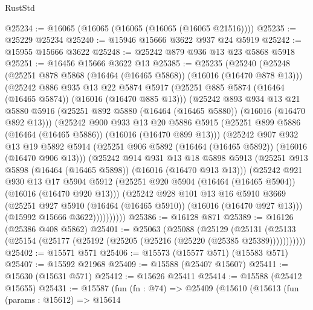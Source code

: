 \begin{lexlean}{RustStd}
\begin{coremodule}
@25234 := @16065 (@16065 (@16065 (@16065 (@16065 @21516))))
@25235 := @25229 @25234
@25240 := @15946 @15666 @3622 @937 @24 @5919
@25242 := @15955 @15666 @3622
@25248 := @25242 @879 @936 @13 @23 @5868 @5918
@25251 := @16456 @15666 @3622 @13
@25385 := @25235
    (@25240
      (@25248
        (@25251 @878 @5868 (@16464 (@16465 @5868)) (@16016 (@16470 @878 @13)))
        (@25242
          @886
          @935
          @13
          @22
          @5874
          @5917
          (@25251 @885 @5874 (@16464 (@16465 @5874)) (@16016 (@16470 @885 @13)))
          (@25242
            @893
            @934
            @13
            @21
            @5880
            @5916
            (@25251 @892 @5880 (@16464 (@16465 @5880)) (@16016 (@16470 @892 @13)))
            (@25242
              @900
              @933
              @13
              @20
              @5886
              @5915
              (@25251 @899 @5886 (@16464 (@16465 @5886)) (@16016 (@16470 @899 @13)))
              (@25242
                @907
                @932
                @13
                @19
                @5892
                @5914
                (@25251 @906 @5892 (@16464 (@16465 @5892)) (@16016 (@16470 @906 @13)))
                (@25242
                  @914
                  @931
                  @13
                  @18
                  @5898
                  @5913
                  (@25251 @913 @5898 (@16464 (@16465 @5898)) (@16016 (@16470 @913 @13)))
                  (@25242
                    @921
                    @930
                    @13
                    @17
                    @5904
                    @5912
                    (@25251 @920 @5904 (@16464 (@16465 @5904)) (@16016 (@16470 @920 @13)))
                    (@25242
                      @928
                      @101
                      @13
                      @16
                      @5910
                      @3669
                      (@25251 @927 @5910 (@16464 (@16465 @5910)) (@16016 (@16470 @927 @13)))
                      (@15992 @15666 @3622))))))))))
@25386 := @16128 @871
@25389 := @16126 (@25386 @408 @5862)
@25401 := @25063
    (@25088
      (@25129
        (@25131 (@25133 (@25154 (@25177 (@25192 (@25205 (@25216 (@25220 (@25385 @25389)))))))))))
@25402 := @15571 @571
@25406 := @15573 (@15577 @571) (@15583 @571)
@25407 := @15592 @21968
@25409 := @15588 (@25407 @15607)
@25411 := @15630 (@15631 @571)
@25412 := @15626 @25411
@25414 := @15588 (@25412 @15655)
@25431 := @15587
    (fun (fn : @74) =>
    @25409
      (@15610
        (@15613
          (fun (params : @15612) =>
          @15614

\end{coremodule}
\end{lexlean}

